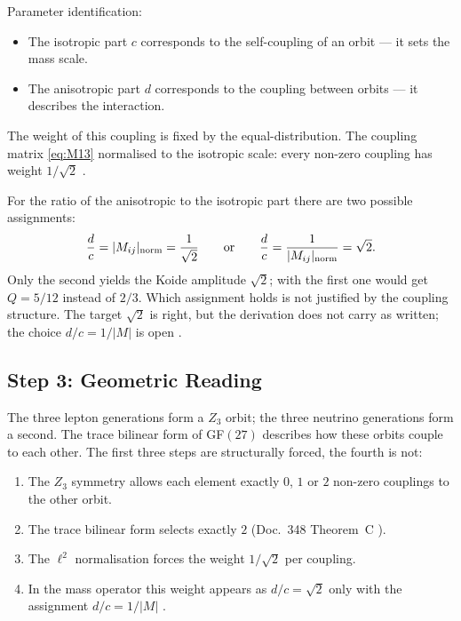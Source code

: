 Parameter identification:
\begin{itemize}
  \item The isotropic part $c$ corresponds to the self-coupling of an orbit
    --- it sets the mass scale.
  \item The anisotropic part $d$ corresponds to the coupling between orbits
    --- it describes the interaction.
\end{itemize}

The weight of this coupling is fixed by the equal-distribution.
The coupling matrix \eqref{eq:M13} normalised to the isotropic scale:
every non-zero coupling has weight $1/\sqrt{2}$ \BM.

For the ratio of the anisotropic to the isotropic part there are two possible
assignments:
\begin{equation}
  \frac{d}{c} = |M_{ij}|_{\rm norm} = \frac{1}{\sqrt{2}}
  \qquad\text{or}\qquad
  \frac{d}{c} = \frac{1}{|M_{ij}|_{\rm norm}} = \sqrt{2}.
  \label{eq:dc}
\end{equation}
Only the second yields the Koide amplitude $\sqrt{2}$; with the first one would
get $Q = 5/12$ instead of $2/3$. Which assignment holds is not justified by the
coupling structure. The target $\sqrt{2}$ is right, but the derivation does not
carry as written; the choice $d/c = 1/|M|$ is open \SM.

\subsection*{Step 3: Geometric Reading}

The three lepton generations form a $Z_3$ orbit; the three neutrino generations
form a second. The trace bilinear form of GF$(27)$ describes how these orbits
couple to each other. The first three steps are structurally forced, the fourth is not:

\begin{enumerate}
  \item The $Z_3$ symmetry allows each element exactly $0$, $1$ or $2$
    non-zero couplings to the other orbit.
  \item The trace bilinear form selects exactly $2$ (Doc.~348 Theorem~C \BM).
  \item The $\ell^2$ normalisation forces the weight $1/\sqrt{2}$ per coupling.
  \item In the mass operator this weight appears as $d/c = \sqrt{2}$ only
    with the assignment $d/c = 1/|M|$ \SM.
\end{enumerate}

